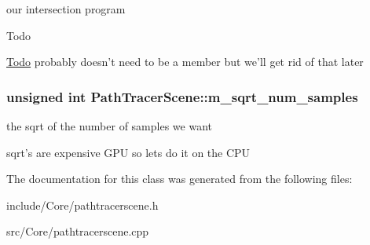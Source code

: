 our intersection program 

\begin{DoxyRefDesc}{Todo}
\item[\hyperlink{todo__todo000006}{Todo}]probably doesn't need to be a member but we'll get rid of that later \end{DoxyRefDesc}
\hypertarget{class_path_tracer_scene_a54c990fc584924a849a91c345781ba1f}{
\subsubsection[{m\-\_\-sqrt\-\_\-num\-\_\-samples}]{\setlength{\rightskip}{0pt plus 5cm}unsigned int Path\-Tracer\-Scene\-::m\-\_\-sqrt\-\_\-num\-\_\-samples\hspace{0.3cm}{\ttfamily [private]}}}\label{class_path_tracer_scene_a54c990fc584924a849a91c345781ba1f}


the sqrt of the number of samples we want 

sqrt's are expensive G\-P\-U so lets do it on the C\-P\-U 

The documentation for this class was generated from the following files\-:\begin{DoxyCompactItemize}
\item 
include/\-Core/pathtracerscene.\-h\item 
src/\-Core/pathtracerscene.\-cpp\end{DoxyCompactItemize}
